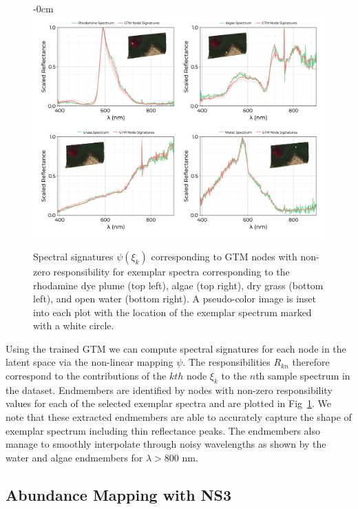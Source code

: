 \documentclass[remotesensing,article,submit,pdftex,moreauthors]{Definitions/mdpi}
\begin{document}
\begin{figure}[t]
\begin{adjustwidth}{-\extralength}{0cm}
\centering
\includegraphics[width=17.0cm]{paper/figures/results/spectral-signatures.png}
\end{adjustwidth}
\caption{Spectral signatures $\psi(\xi_k)$ corresponding to GTM nodes with non-zero responsibility for exemplar spectra corresponding to the rhodamine dye plume (top left), algae (top right), dry grass (bottom left), and open water (bottom right). A pseudo-color image is inset into each plot with the location of the exemplar spectrum marked with a white circle. \label{fig:spectral-signatures}}
\end{figure}  

Using the trained GTM we can compute spectral signatures for each node in the latent space via the non-linear mapping $\psi$. The responsibilities $R_{kn}$ therefore correspond to the contributions of the $kth$ node $\xi_k$ to the $n$th sample spectrum in the dataset. Endmembers are identified by nodes with non-zero responsibility values for each of the selected exemplar spectra and are plotted in Fig~\ref{fig:spectral-signatures}. We note that these extracted endmembers are able to accurately capture the shape of exemplar spectrum including thin reflectance peaks. The endmembers also manage to smoothly interpolate through noisy wavelengths as shown by the water and algae endmembers for $\lambda > 800$ nm.

\subsection{Abundance Mapping with NS3}
\end{document}
